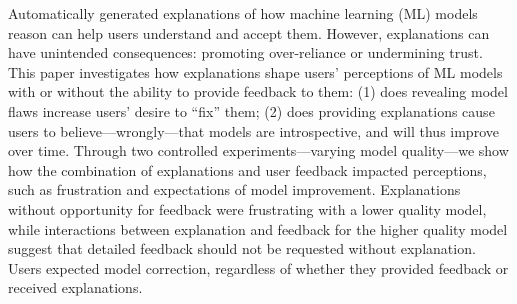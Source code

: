 Automatically generated explanations of how machine learning (ML) models reason can help users understand and accept them.
However, explanations can have unintended consequences: promoting
over-reliance or undermining trust.
This paper investigates how explanations shape users' perceptions of ML models with or without the ability to provide feedback to them:
(1) does revealing model flaws increase users' desire to ``fix'' them;
(2) does providing explanations cause users to
believe---wrongly---that models are introspective, and will
thus improve over time.
Through two controlled
experiments---varying model quality---we show how the combination of explanations and user feedback impacted perceptions, such as
frustration and expectations of model improvement.
Explanations without opportunity for feedback were frustrating with a lower quality model, while interactions between explanation and feedback for the higher quality model suggest that detailed feedback should not be requested without explanation. 
Users expected model correction, regardless of whether they provided feedback or received explanations. 
